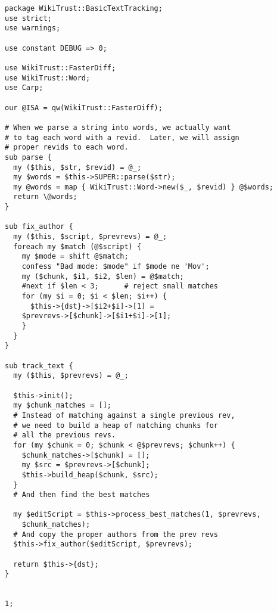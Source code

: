 \begin{lstlisting}
package WikiTrust::BasicTextTracking;
use strict;
use warnings;

use constant DEBUG => 0;

use WikiTrust::FasterDiff;
use WikiTrust::Word;
use Carp;

our @ISA = qw(WikiTrust::FasterDiff);

# When we parse a string into words, we actually want
# to tag each word with a revid.  Later, we will assign
# proper revids to each word.
sub parse {
  my ($this, $str, $revid) = @_;
  my $words = $this->SUPER::parse($str);
  my @words = map { WikiTrust::Word->new($_, $revid) } @$words;
  return \@words;
}

sub fix_author {
  my ($this, $script, $prevrevs) = @_;
  foreach my $match (@$script) {
    my $mode = shift @$match;
    confess "Bad mode: $mode" if $mode ne 'Mov';
    my ($chunk, $i1, $i2, $len) = @$match;
    #next if $len < 3;	    # reject small matches
    for (my $i = 0; $i < $len; $i++) {
      $this->{dst}->[$i2+$i]->[1] =
	$prevrevs->[$chunk]->[$i1+$i]->[1];
    }
  }
}

sub track_text {
  my ($this, $prevrevs) = @_;

  $this->init();
  my $chunk_matches = [];
  # Instead of matching against a single previous rev,
  # we need to build a heap of matching chunks for
  # all the previous revs.
  for (my $chunk = 0; $chunk < @$prevrevs; $chunk++) {
    $chunk_matches->[$chunk] = [];
    my $src = $prevrevs->[$chunk];
    $this->build_heap($chunk, $src);
  }
  # And then find the best matches

  my $editScript = $this->process_best_matches(1, $prevrevs,
    $chunk_matches);
  # And copy the proper authors from the prev revs
  $this->fix_author($editScript, $prevrevs);

  return $this->{dst};
}


1;
\end{lstlisting}
